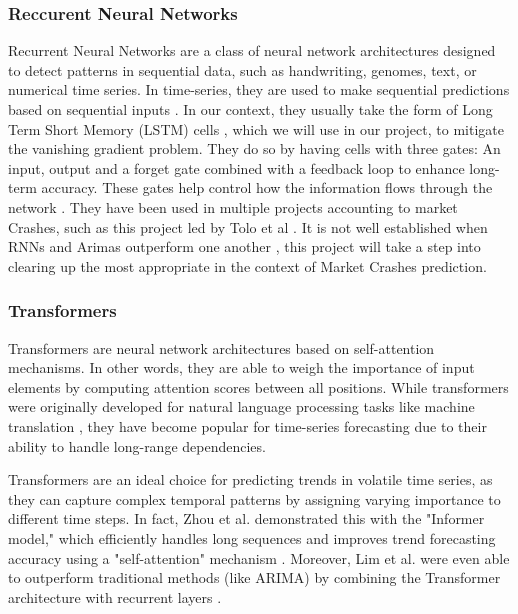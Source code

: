 \documentclass[12pt, letterpaper]{article}
\begin{document}
\subsubsection*{Reccurent Neural Networks}
Recurrent Neural Networks are a class of neural network architectures designed to detect patterns in sequential data, such as handwriting, genomes, text, or numerical time series. In time-series, they are used to make sequential predictions based on sequential inputs \cite{Schmidt}. In our context, they usually take the form of Long Term Short Memory (LSTM) cells \cite{Hansika}, which we will use in our project, to mitigate the vanishing gradient problem. They do so by having cells with three gates: An input, output and a forget gate combined with a feedback loop to enhance long-term accuracy. These gates help control how the information flows through the network \cite{Hansika}. They have been used in multiple projects accounting to market Crashes, such as this project led by Tolo et al \cite{Tolo}. It is not well established when RNNs and Arimas outperform one another \cite{Hansika}, this project will take a step into clearing up the most appropriate in the context of Market Crashes prediction.

\subsubsection*{Transformers}
Transformers are neural network architectures based on self-attention mechanisms. In other words, they are able to weigh the importance of input elements by computing attention scores between all positions. While transformers were originally developed for natural language processing tasks like machine translation \cite{vaswani2017attention}, they have become popular for time-series forecasting due to their ability to handle long-range dependencies.

Transformers are an ideal choice for predicting trends in volatile time series, as they can capture complex temporal patterns by assigning varying importance to different time steps. In fact, Zhou et al. demonstrated this with the "Informer model," which efficiently handles long sequences and improves trend forecasting accuracy using a "self-attention" mechanism \cite{zhou2021informer}. Moreover, Lim et al. were even able to outperform traditional methods (like ARIMA) by combining the Transformer architecture with recurrent layers \cite{lim2021temporal}. 
\end{document}
